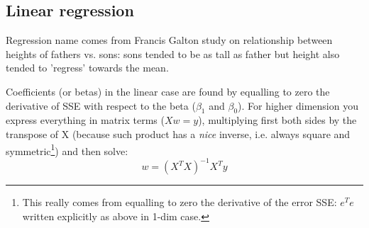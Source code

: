 \documentclass[11pt]{article}
\begin{document}
\subsection{Linear regression}
Regression name comes from Francis Galton study on relationship between heights of fathers vs. sons: sons  tended to be as tall as father but height also tended to 'regress' towards the mean.  

Coefficients (or betas) in the linear case are found by equalling to zero the derivative of SSE with respect to the beta ($\beta_1$ and $\beta_0$). For higher dimension you express everything in matrix terms ($X w = y$), multiplying first both sides by the transpose of X (because such product has a \textit{nice} inverse, i.e. always square and symmetric\footnote{This really comes from equalling to zero the derivative of the error SSE: $e^T e$ written explicitly as above in 1-dim case.}) and then solve:
\[ w = (X^T X)^{-1} X^T y
\]
\end{document}
